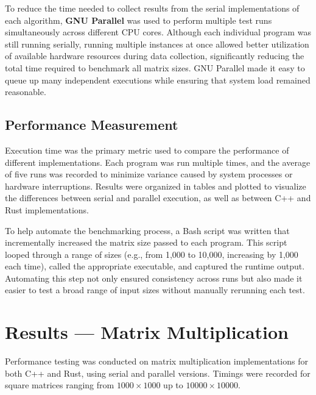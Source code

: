 \documentclass[12pt]{article}
\begin{document}
To reduce the time needed to collect results from the serial implementations of each algorithm, \textbf{GNU Parallel} was used to perform multiple test runs
simultaneously across different CPU cores. Although each individual program was still running serially, running multiple instances at once allowed better
utilization of available hardware resources during data collection, significantly reducing the total time required to benchmark all matrix sizes.
GNU Parallel made it easy to queue up many independent executions while ensuring that system load remained reasonable.

\subsection*{Performance Measurement}

Execution time was the primary metric used to compare the performance of different implementations. Each program was run multiple times, and the average
of five runs was recorded to minimize variance caused by system processes or hardware interruptions. Results were organized in tables and plotted to visualize
the differences between serial and parallel execution, as well as between C++ and Rust implementations.

To help automate the benchmarking process, a Bash script was written that incrementally increased the matrix size passed to each program. This script looped
through a range of sizes (e.g., from 1,000 to 10,000, increasing by 1,000 each time), called the appropriate executable, and captured the runtime output.
Automating this step not only ensured consistency across runs but also made it easier to test a broad range of input sizes without manually rerunning
each test.

\section{Results --- Matrix Multiplication}
Performance testing was conducted on matrix multiplication implementations for both C++ and Rust, using serial and parallel versions. Timings were recorded for square matrices ranging from \(1000 \times 1000\) up to \(10000 \times 10000\).
\end{document}
